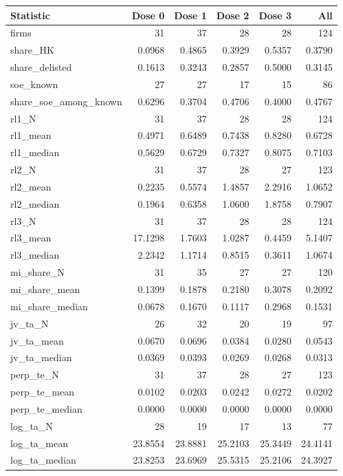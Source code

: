 \begin{threeparttable}
\begin{tabular}{lrrrrr}
\toprule
Statistic & Dose 0 & Dose 1 & Dose 2 & Dose 3 & All \\
\midrule
firms & 31 & 37 & 28 & 28 & 124 \\
share\_HK & 0.0968 & 0.4865 & 0.3929 & 0.5357 & 0.3790 \\
share\_delisted & 0.1613 & 0.3243 & 0.2857 & 0.5000 & 0.3145 \\
soe\_known & 27 & 27 & 17 & 15 & 86 \\
share\_soe\_among\_known & 0.6296 & 0.3704 & 0.4706 & 0.4000 & 0.4767 \\
rl1\_N & 31 & 37 & 28 & 28 & 124 \\
rl1\_mean & 0.4971 & 0.6489 & 0.7438 & 0.8280 & 0.6728 \\
rl1\_median & 0.5629 & 0.6729 & 0.7327 & 0.8075 & 0.7103 \\
rl2\_N & 31 & 37 & 28 & 27 & 123 \\
rl2\_mean & 0.2235 & 0.5574 & 1.4857 & 2.2916 & 1.0652 \\
rl2\_median & 0.1964 & 0.6358 & 1.0600 & 1.8758 & 0.7907 \\
rl3\_N & 31 & 37 & 28 & 28 & 124 \\
rl3\_mean & 17.1298 & 1.7603 & 1.0287 & 0.4459 & 5.1407 \\
rl3\_median & 2.2342 & 1.1714 & 0.8515 & 0.3611 & 1.0674 \\
mi\_share\_N & 31 & 35 & 27 & 27 & 120 \\
mi\_share\_mean & 0.1399 & 0.1878 & 0.2180 & 0.3078 & 0.2092 \\
mi\_share\_median & 0.0678 & 0.1670 & 0.1117 & 0.2968 & 0.1531 \\
jv\_ta\_N & 26 & 32 & 20 & 19 & 97 \\
jv\_ta\_mean & 0.0670 & 0.0696 & 0.0384 & 0.0280 & 0.0543 \\
jv\_ta\_median & 0.0369 & 0.0393 & 0.0269 & 0.0268 & 0.0313 \\
perp\_te\_N & 31 & 37 & 28 & 27 & 123 \\
perp\_te\_mean & 0.0102 & 0.0203 & 0.0242 & 0.0272 & 0.0202 \\
perp\_te\_median & 0.0000 & 0.0000 & 0.0000 & 0.0000 & 0.0000 \\
log\_ta\_N & 28 & 19 & 17 & 13 & 77 \\
log\_ta\_mean & 23.8554 & 23.8881 & 25.2103 & 25.3449 & 24.4141 \\
log\_ta\_median & 23.8253 & 23.6969 & 25.5315 & 25.2106 & 24.3927 \\

\end{tabular}
\end{threeparttable}
